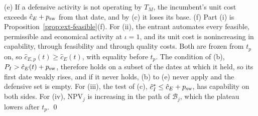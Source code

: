 (e) If a defensive activity is not operating by $T_M$, the incumbent's unit cost exceeds $\hat c_E+p_{\rm sw}$ from that date, and by (c) it loses its base. (f) Part (i) is Proposition~\ref{prop:ext-feasible}(f). For (ii), the entrant automates every feasible, permissible and economical activity at $\iota=1$, and its unit cost is nonincreasing in capability, through feasibility and through quality costs. Both are frozen from $t_p$ on, so $\hat c_{E,p}(t)\ge\hat c_E(t)$, with equality before $t_p$. The condition of (b), $P_I>\hat c_E(t)+p_{\rm sw}$, therefore holds on a subset of the dates at which it held, so its first date weakly rises, and if it never holds, (b) to (e) never apply and the defensive set is empty. For (iii), the test of (c), $\hat c_I^*\le\hat c_E+p_{\rm sw}$, has capability on both sides. For (iv), $\mathrm{NPV}_j$ is increasing in the path of $\mathcal B_j$, which the plateau lowers after $t_p$. \qed

